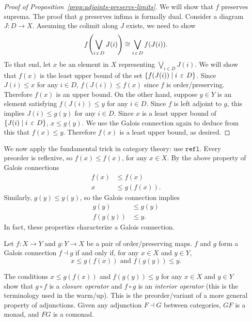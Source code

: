 \documentclass[../main.tex]{subfiles}
\begin{document}
\begin{proof}[Proof of Proposition~\ref{prop:adjoints-preserve-limits}]
  We will show that \(f\) preserves suprema. The proof that \(g\) preserves
  infima is formally dual. Consider a diagram \(J : D \to
  X\). Assuming the colimit along \(J\) exists, we need to show
  \[%
    f\pwrap{ \bigvee_{i \in D} J(i) } \cong \bigvee_{i \in D} f(J(i)).
  \]%
  To that end, let \(x\) be an element in \(X\) representing \(\bigvee_{i \in D}
  J(i)\). We will show that \(f(x)\) is the least upper bound of the set
  \({\left\{ f(J(i)) \mid i \mathrel{\,\varepsilon\,} D \right\}}\). Since \(J(i) \leq x\) for any \(i \in D\),
  \(f(J(i)) \leq f(x)\) since \(f\) is order\-/preserving. Therefore \(f(x)\) is
  an upper bound. On the other hand, suppose \(y \in Y\) is an element
  satisfying \(f(J(i)) \leq y\) for any \(i \in D\). Since \(f\) is left adjoint
  to \(g\), this implies \(J(i) \leq g(y)\) for any \(i \in D\). Since \(x\) is
  a least upper bound of \({\left\{J(i) \mid i \mathrel{\,\varepsilon\,} D\right\}}\), \(x \leq g(y)\). We use
  the Galois connection again to deduce from this that \(f(x) \leq
  y\). Therefore \(f(x)\) is a least upper bound, as desired.
\end{proof}
We now apply the fundamental trick in category theory: use
\(\texttt{refl}\). Every preorder is reflexive, so \(f(x) \leq f(x)\), for any
\(x \in X\). By the above property of Galois connections
\[%
  \begin{array}{rl}
    f(x) &\leq f(x) \\\hline
    x &\leq g(f(x)).
  \end{array}
\]%
Similarly, \(g(y) \leq g(y)\), so the Galois connection implies
\[%
  \begin{array}{rl}
    g(y) &\leq g(y) \\\hline
    f(g(y)) &\leq y.
  \end{array}
\]%
In fact, these properties characterize a Galois connection.
\begin{theorem}\label{thm:galois-connection-closure}
  Let \(f: X \to Y\) and \(g: Y \to X\) be a pair of order\-/preserving
  maps. \(f\) and \(g\) form a Galois connection \(f \dashv g\) if and only if,
  for any \(x \in X\) and \(y \in Y\),
  \[%
    x \leq g(f(x)) \text{ and } f(g(y)) \leq y.
  \]%
\end{theorem}
\begin{warning_box*}
  The conditions \(x \leq g(f(x))\) and \(f(g(y)) \leq y\) for any \(x \in X\)
  and \(y \in Y\) show that \(g \circ f\) is a \emph{closure operator} and \(f
  \circ g\) is an \emph{interior operator} (this is the terminology used in the
  warm\-/up). This is the preorder\-/variant of a more general property of
  adjunctions. Given any adjunction \(F \dashv G\) between categories, \(GF\) is
  a monad, and \(FG\) is a comonad.
\end{warning_box*}
\end{document}
